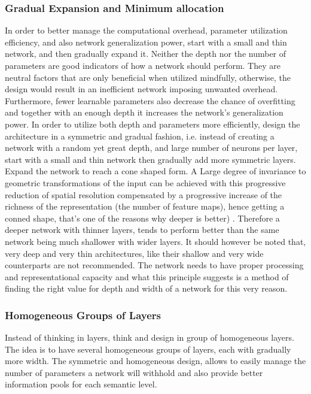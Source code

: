 \documentclass{article} \usepackage{lets_keepit_simple,times}
\begin{document}
\subsubsection{Gradual Expansion and Minimum allocation}
In order to better manage the computational overhead, parameter utilization efficiency, and also network generalization power, start with a small and thin network, and then gradually expand it. Neither the depth nor the number of parameters are good indicators of how a network should perform. They are neutral factors that are only beneficial when utilized mindfully, otherwise, the design would result in an inefficient network imposing unwanted overhead. Furthermore, fewer learnable parameters also decrease the chance of overfitting and together with an enough depth it increases the network's generalization power. In order to utilize both depth and parameters more efficiently, design the architecture in a symmetric and gradual fashion, i.e. instead of creating a network with a random yet great depth, and large number of neurons per layer, start with a small and thin network then gradually add more symmetric layers. Expand the network to reach a cone shaped form. A Large degree of invariance to geometric transformations of the input can be achieved with this progressive reduction of spatial resolution compensated by a progressive increase of the richness of the representation (the number of feature maps), hence getting a conned shape, that's one of the reasons why deeper is better) \cite{Lecun_GradientBased_CNN_1998}. Therefore a deeper network with thinner layers, tends to perform better than the same network being much shallower with wider layers. It should however be noted that, very deep and very thin architectures, like their shallow and very wide counterparts are not recommended. The network needs to have proper processing and representational capacity and what this principle suggests is a method of finding the right value for depth and width of a network for this very reason. 

\subsubsection{Homogeneous Groups of Layers}
Instead of thinking in layers, think and design in group of homogeneous layers. The idea is to have several homogeneous groups of layers, each with gradually more width. The symmetric and homogeneous design, allows to easily manage the number of parameters a network will withhold and also provide better information pools for each semantic level.  
\end{document}
